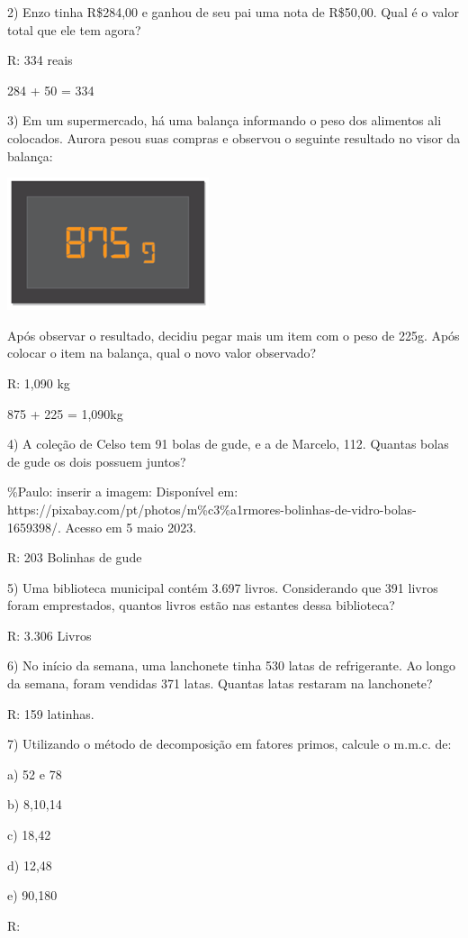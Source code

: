2) Enzo tinha R\$284,00 e ganhou de seu pai uma nota de R\$50,00. Qual é
o valor total que ele tem agora?

R: 334 reais

284 + 50 = 334

3) Em um supermercado, há uma balança informando o peso dos alimentos
ali colocados. Aurora pesou suas compras e observou o seguinte resultado
no visor da balança:

\includegraphics[width=2.33333in,height=1.53125in]{./imgSAEB_6_MAT/media/image23.png}

Após observar o resultado, decidiu pegar mais um item com o peso de
225g. Após colocar o item na balança, qual o novo valor observado?

R: 1,090 kg

875 + 225 = 1,090kg

4) A coleção de Celso tem 91 bolas de gude, e a de Marcelo, 112. Quantas
bolas de gude os dois possuem juntos?

\%Paulo: inserir a imagem: Disponível em:
https://pixabay.com/pt/photos/m\%c3\%a1rmores-bolinhas-de-vidro-bolas-1659398/.
Acesso em 5 maio 2023.

R: 203 Bolinhas de gude

5) Uma biblioteca municipal contém 3.697 livros. Considerando que 391
livros foram emprestados, quantos livros estão nas estantes dessa
biblioteca?

R: 3.306 Livros

6) No início da semana, uma lanchonete tinha 530 latas de refrigerante.
Ao longo da semana, foram vendidas 371 latas. Quantas latas restaram na
lanchonete?

R: 159 latinhas.

7) Utilizando o método de decomposição em fatores primos, calcule o
m.m.c. de:

a) 52 e 78

b) 8,10,14

c) 18,42

d) 12,48

e) 90,180

R:

